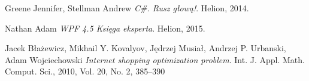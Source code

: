 \documentclass[a4paper]{article}
\begin{document}
\begin{thebibliography}{9}

  Greene Jennifer, Stellman Andrew 
  \emph{C\#. Rusz głową!}.
  Helion,
  2014.
  
	Nathan Adam
	\emph{WPF 4.5 Księga eksperta}. Helion, 2015.  
  
	Jacek Błażewicz, Mikhail Y. Kovalyov, Jędrzej Musiał, Andrzej P. Urbanski, Adam Wojciechowski
	\emph{Internet shopping optimization problem}.
	Int. J. Appl. Math. Comput. Sci., 2010, Vol. 20, No. 2, 385–390 
	
  \end{thebibliography}
\end{document}
